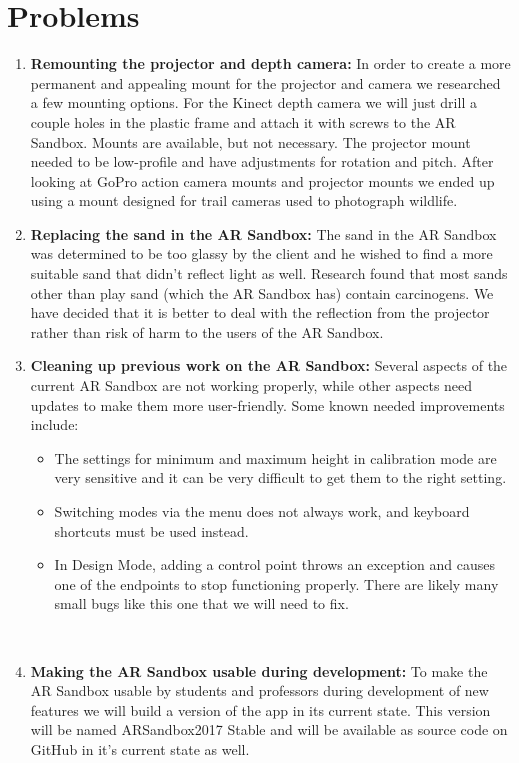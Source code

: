 \documentclass[letterpaper, 10pt, onecolumn, draftclsnofoot]{IEEEtran}
\begin{document}
\section{Problems}
    \begin{enumerate}[label=]
        \item{\textbf{Remounting the projector and depth camera:}} In order to create a more permanent and appealing mount for the projector and camera we researched a few mounting options. For the Kinect depth camera we will just drill a couple holes in the plastic frame and attach it with screws to the AR Sandbox. Mounts are available, but not necessary. \newline The projector mount needed to be low-profile and have adjustments for rotation and pitch. After looking at GoPro action camera mounts and projector mounts we ended up using a mount designed for trail cameras used to photograph wildlife. \\
        
        \item{\textbf{Replacing the sand in the AR Sandbox:}} The sand in the AR Sandbox was determined to be too glassy by the client and he wished to find a more suitable sand that didn't reflect light as well. Research found that most sands other than play sand (which the AR Sandbox has) contain carcinogens. We have decided that it is better to deal with the reflection from the projector rather than risk of harm to the users of the AR Sandbox. \\
        
        \item{\textbf{Cleaning up previous work on the AR Sandbox:}} Several aspects of the current AR Sandbox are not working properly, while other aspects need updates to make them more user-friendly. Some known needed improvements include:
        \begin{itemize}
            \item The settings for minimum and maximum height in calibration mode are very sensitive and it can be very difficult to get them to the right setting.
            \item Switching modes via the menu does not always work, and keyboard shortcuts must be used instead.
            \item In Design Mode, adding a control point throws an exception and causes one of the endpoints to stop functioning properly. There are likely many small bugs like this one that we will need to fix.
        \end{itemize} \
        
        \item{\textbf{Making the AR Sandbox usable during development:}} To make the AR Sandbox usable by students and professors during development of new features we will build a version of the app in its current state. This version will be named ARSandbox2017 Stable and will be available as source code on GitHub in it's current state as well.
    \end{enumerate}
\end{document}
